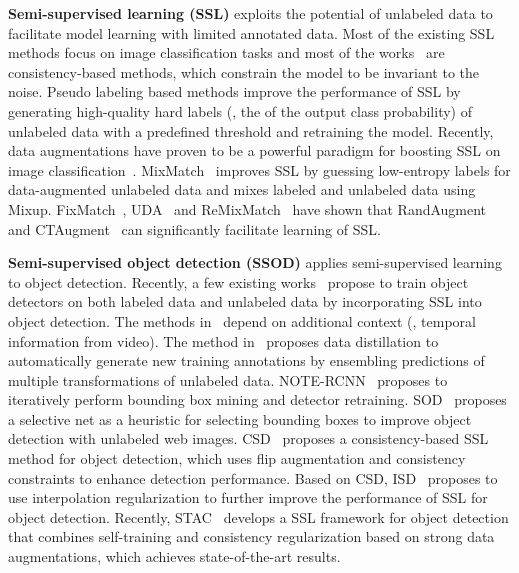 \documentclass[final]{cvpr}
\begin{document}
\noindent \textbf{Semi-supervised learning (SSL)} exploits the potential of unlabeled data to facilitate model learning with limited annotated data. Most of the existing SSL methods focus on image classification tasks and most of the works~\cite{berthelot2019mixmatch,xie2019unsupervised,miyato2018virtual,sajjadi2016regularization,laine2016temporal,tarvainen2017mean,berthelot2019remixmatch,sohn2020fixmatch} are consistency-based methods, which constrain the model to be invariant to the noise.
Pseudo labeling based methods \cite{lee2013pseudo,bachman2014learning,iscen2019label,arazo2020pseudo,xie2020self} improve the performance of SSL by generating high-quality hard labels (\ie, the  of the output class probability) of unlabeled data with a predefined threshold and retraining the model. Recently, data augmentations have proven to be a powerful paradigm for boosting SSL on image classification~\cite{berthelot2019mixmatch,xie2019unsupervised,cubuk2019randaugment,berthelot2019remixmatch,sohn2020fixmatch}.
MixMatch~\cite{berthelot2019mixmatch} improves SSL by guessing low-entropy labels for data-augmented unlabeled data and mixes labeled and unlabeled data using Mixup. FixMatch~\cite{sohn2020fixmatch}, UDA~\cite{xie2019unsupervised} and ReMixMatch~\cite{berthelot2019remixmatch} have shown that RandAugment~\cite{cubuk2019randaugment} and CTAugment~\cite{berthelot2019remixmatch} can significantly facilitate learning of SSL.

\noindent \textbf{Semi-supervised object detection (SSOD)} applies semi-supervised learning to object detection. Recently, a few existing works~\cite{misra2015watch,tang2016large,gao2019note,jeong2019consistency,tang2020proposal,li2020improving,sohn2020simple,jeong2020interpolation} propose to train object detectors on both labeled data and unlabeled data by incorporating SSL into object detection. The methods in~\cite{misra2015watch,tang2016large} depend on additional context (\eg, temporal information from video).
The method in~\cite{radosavovic2018data} proposes data distillation to automatically generate new training annotations by ensembling predictions of multiple transformations of unlabeled data. NOTE-RCNN~\cite{gao2019note} proposes to iteratively perform bounding box mining and detector retraining. SOD~\cite{li2020improving} proposes a selective net as a heuristic for selecting bounding boxes to improve object detection with unlabeled web images.
CSD~\cite{jeong2019consistency} proposes a consistency-based SSL method for object detection, which uses flip augmentation and consistency constraints to enhance detection performance.
Based on CSD, ISD~\cite{jeong2020interpolation} proposes to use interpolation regularization to further improve the performance of SSL for object detection.
Recently, STAC~\cite{sohn2020simple} develops a SSL framework for object detection that combines self-training and consistency regularization based on strong data augmentations, which achieves state-of-the-art results. 
\end{document}
